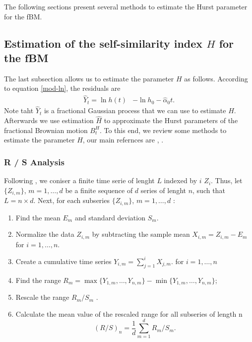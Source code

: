 \documentclass[smallextended]{svjour3}
\begin{document}
        The following sections present several methods to estimate the Hurst 
    parameter for the fBM.


    \subsection{Estimation of the self-similarity index $H$ for the fBM}
    \label{Desc-Est-H}

        The last subsection allows us to estimate the parameter $H$ as follows.
    According to equation \eqref{mod-ln}, the residuals are 
    \begin{align*}
        \hat Y_t= \ln h(t) &
            -\ln h_0 -\widehat \alpha_0 t.
    \end{align*}
        Note taht $\hat Y_t$ is a fractional Gaussian process that we can use 
    to estimate $H$. Afterwards we use estimation $\hat H$ to approximate
    the Hurst parameters of the fractional Brownian motion $B_t^H$.
    To this end, we review some methods to estimate
    the parameter $H$, our main refernces are \cite{we}, .

    \subsubsection{R / S Analysis}
    Following \citet{we}, we coniser a finite time serie of lenght $L$ indexed
    by $i$ $Z_i$. Thus, let $\{Z_{i,m}\}$, $m = 1,\ldots,d$ be a finite 
    sequence of $d$ series of lenght $n$, such that $L = n \times d$.
    Next, for each subseries  
    $\{Z_{i,m}\}$, $m = 1,\ldots,d$ :
    \begin{enumerate}
        \item 
            Find the mean $E_m$ and standard deviation $S_m$.
        \item 
            Normalize the data $Z_{i,m}$  by subtracting the sample mean 
            $X_{i,m} = Z_{i,m}-E_m$ for $i=1,\ldots,n$.
        \item 
            Create a cumulative time series $Y_{i,m} = \sum_{j=1}^i X_{j,m}$.
            for $i = 1,\ldots,n$
        \item 
            Find the range 
            $   
                R_m = \max\{Y_{1,m},\ldots, Y_{n,m}\} -
                \min\{Y_{1,m},\ldots, Y_{n,m} \}
            $;
        \item 
            Rescale the range $R_m/S_m$ .
        \item 
            Calculate the mean value of the rescaled range
            for all subseries of length n
            \[
                (R/S)_n =\frac{1}{d}\sum_{m=1}^d  R_m /S_m.
            \]
    \end{enumerate}
\end{document}
